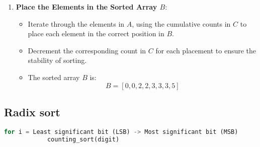 \begin{example}
\begin{enumerate}
        \item \textbf{Place the Elements in the Sorted Array \( B \)}:
        \begin{itemize}
            \item Iterate through the elements in \( A \), using the cumulative counts in \( C \) to place each element in the correct position in \( B \).
            \item Decrement the corresponding count in \( C \) for each placement to ensure the stability of sorting.
            \item The sorted array \( B \) is:
            \[
            B = [0, 0, 2, 2, 3, 3, 3, 5]
            \]
        \end{itemize}
    \end{enumerate}
\end{example}

\subsection{Radix sort}
\begin{definition}
    \begin{lstlisting}[language=Python, caption={Radix Sort Pseudocode}]
        for i = Least significant bit (LSB) -> Most significant bit (MSB)
            counting_sort(digit)
    \end{lstlisting}
\end{definition}


